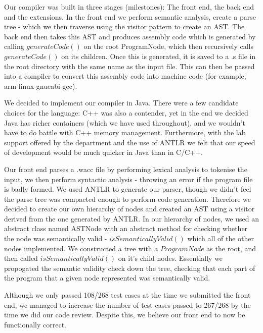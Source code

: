 \documentclass[a4paper, 11pt]{article} %
\begin{document}

Our compiler was built in three stages (milestones): The front end, the back end and the extensions. In the front end we perform semantic analysis, create a parse tree - which we then traverse using the visitor pattern to create an AST. The back end then takes this AST and produces assembly code which is generated by calling $ generateCode() $ on the root ProgramNode, which then recursively calls $ generateCode() $ on its children. Once this is generated, it is saved to a .s file in the root directory with the same name as the input file. This can then be passed into a compiler to convert this assembly code into machine code (for example, arm-linux-gnueabi-gcc).

We decided to implement our compiler in Java. There were a few candidate choices for the language: C++ was also a contender, yet in the end we decided Java has richer containers (which we have used throughout), and we wouldn't have to do battle with C++ memory management. Furthermore, with the lab support offered by the department and the use of ANTLR we felt that our speed of development would be much quicker in Java than in C/C++. 

Our front end parses a .wacc file by performing lexical analysis to tokenise the input, we then perform syntactic analysis - throwing an error if the program file is badly formed. We used ANTLR to generate our parser, though we didn't feel the parse tree was compacted enough to perform code generation. Therefore we decided to create our own hierarchy of nodes and created an AST using a visitor derived from the one generated by ANTLR. 
In our hierarchy of nodes, we used an abstract class named ASTNode with an abstract method for checking whether the node was semantically valid - $ isSemanticallyValid() $ which all of the other nodes implemented.  We constructed a tree with a $ ProgramNode $ as the root, and then called $ isSemanticallyValid() $ on it's child nodes. Essentially we propogated the semantic validity check down the tree, checking that each part of the program that a given node represented was semantically valid.

Although we only passed 108/268 test cases at the time we submitted the front end, we managed to increase the number of test cases passed to 267/268 by the time we did our code review. Despite this, we believe our front end to now be functionally correct. 
\end{document}
